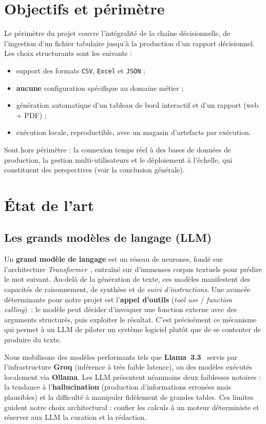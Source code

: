 \section{Objectifs et périmètre}
Le périmètre du projet couvre l'intégralité de la chaîne décisionnelle, de
l'ingestion d'un fichier tabulaire jusqu'à la production d'un rapport
décisionnel. Les choix structurants sont les suivants :
\begin{itemize}
  \item support des formats \texttt{CSV}, \texttt{Excel} et \texttt{JSON} ;
  \item \textbf{aucune} configuration spécifique au domaine métier ;
  \item génération automatique d'un tableau de bord interactif et d'un
        rapport (web + PDF) ;
  \item exécution locale, reproductible, avec un magasin d'artefacts par
        exécution.
\end{itemize}
Sont hors périmètre : la connexion temps réel à des bases de données de
production, la gestion multi-utilisateurs et le déploiement à l'échelle, qui
constituent des perspectives (voir la conclusion générale).

\section{État de l'art}

\subsection{Les grands modèles de langage (LLM)}
Un \textbf{grand modèle de langage} est un réseau de neurones, fondé sur
l'architecture \textit{Transformer}~\cite{vaswani2017attention}, entraîné sur
d'immenses corpus textuels pour prédire le mot suivant. Au-delà de la
génération de texte, ces modèles manifestent des capacités de raisonnement, de
synthèse et de \emph{suivi d'instructions}. Une avancée déterminante pour notre
projet est l'\textbf{appel d'outils} (\textit{tool use} / \textit{function
calling})~: le modèle peut décider d'invoquer une fonction externe avec des
arguments structurés, puis exploiter le résultat. C'est précisément ce
mécanisme qui permet à un LLM de piloter un système logiciel plutôt que de se
contenter de produire du texte.

Nous mobilisons des modèles performants tels que \textbf{Llama~3.3}~\cite{llama3}
servis par l'infrastructure \textbf{Groq} (inférence à très faible latence), ou
des modèles exécutés localement via \textbf{Ollama}. Les LLM présentent
néanmoins deux faiblesses notoires : la tendance à l'\textbf{hallucination}
(production d'informations erronées mais plausibles) et la difficulté à
manipuler fidèlement de grandes tables. Ces limites guident notre choix
architectural : confier les calculs à un moteur déterministe et réserver aux
LLM la curation et la rédaction.

